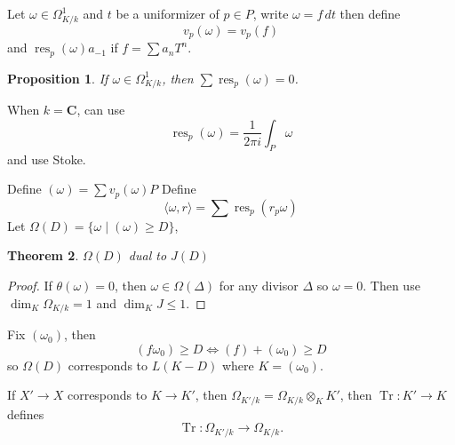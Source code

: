 \documentclass[leqno]{amsart}
\newcommand{\C}{\mathbf C}
\DeclareMathOperator{\Tr}{Tr}
\newcommand{\1}{\mathbf{1}}
\DeclareMathOperator{\res}{res}
\newtheorem{thm}{Theorem}[section]
\newtheorem{prop}[thm]{Proposition}
\theoremstyle{definition}
\theoremstyle{remark}
\begin{document}
Let $\omega\in \Omega^1_{K/k}$ 
and $t$ be a uniformizer of  $p\in P$,
write  $\omega=f\,dt$
then define
 \[
	 v_p(\omega)=v_p(f)
\]
and $\res_p(\omega)a_{-1}$
if  $f=\sum a_nT^n$.

\begin{prop}
	If $\omega\in \Omega^1_{K/k}$,
	then  $\sum \res_p(\omega)=0$.
\end{prop}
When $k=\C$, can use
 \[
	 \res_p(\omega)=\frac{1}{2\pi i}\int_P\omega
\]
and use Stoke.

Define $(\omega)=\sum v_p(\omega)P$
Define 
 \[
	 \langle \omega, r\rangle=\sum\res_p(r_p\omega)
\]
Let $\Omega(D)=\{\omega\mid (\omega)\geq D\}$,
\begin{thm}
	$\Omega(D)$ dual to  $J(D)$
\end{thm}
\begin{proof}
	If $\theta(\omega)=0$,
	then  $\omega\in \Omega(\Delta)$
	for any divisor  $\Delta$ so  $\omega=0$.
	Then use  $\dim_K\Omega_{K/k}=1$
	and $\dim_K J\leq 1$.
\end{proof}

Fix $(\omega_0)$, then
 \[
	 (f\omega_0)\geq D\Longleftrightarrow
	 (f)+(\omega_0)\geq D
\]
so $\Omega(D)$ corresponds to  $L(K-D)$
where  $K=(\omega_0)$.


If $X'\to X$ corresponds to  $K\to K'$,
then  $\Omega_{K'/k}=\Omega_{K/k}\otimes_KK'$,
then $\Tr\colon K'\to K$
defines 
 \[
 	\Tr\colon \Omega_{K'/k}\to \Omega_{K/k}.
 \]

\end{document}

